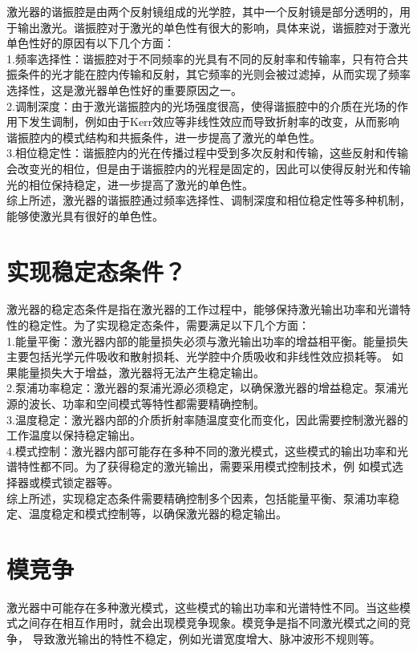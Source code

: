 \documentclass[12pt, a4paper, oneside]{article}
\begin{document}
\begin{spacing}{2.0}
激光器的谐振腔是由两个反射镜组成的光学腔，其中一个反射镜是部分透明的，用于输出激光。谐振腔对于激光的单色性有很大的影响，具体来说，谐振腔对于激光单色性好的原因有以下几个方面：
\\
1.频率选择性：谐振腔对于不同频率的光具有不同的反射率和传输率，只有符合共振条件的光才能在腔内传输和反射，其它频率的光则会被过滤掉，从而实现了频率选择性，这是激光器单色性好的重要原因之一。
\\
2.调制深度：由于激光谐振腔内的光场强度很高，使得谐振腔中的介质在光场的作用下发生调制，例如由于Kerr效应等非线性效应而导致折射率的改变，从而影响谐振腔内的模式结构和共振条件，进一步提高了激光的单色性。
\\
3.相位稳定性：谐振腔内的光在传播过程中受到多次反射和传输，这些反射和传输会改变光的相位，但是由于谐振腔内的光程是固定的，因此可以使得反射光和传输光的相位保持稳定，进一步提高了激光的单色性。
\\
综上所述，激光器的谐振腔通过频率选择性、调制深度和相位稳定性等多种机制，能够使激光具有很好的单色性。

\section{实现稳定态条件？ }
激光器的稳定态条件是指在激光器的工作过程中，能够保持激光输出功率和光谱特性的稳定性。为了实现稳定态条件，需要满足以下几个方面：
\\
1.能量平衡：激光器内部的能量损失必须与激光输出功率的增益相平衡。能量损失主要包括光学元件吸收和散射损耗、光学腔中介质吸收和非线性效应损耗等。
如果能量损失大于增益，激光器将无法产生稳定输出。
\\
2.泵浦功率稳定：激光器的泵浦光源必须稳定，以确保激光器的增益稳定。泵浦光源的波长、功率和空间模式等特性都需要精确控制。
\\
3.温度稳定：激光器内部的介质折射率随温度变化而变化，因此需要控制激光器的工作温度以保持稳定输出。
\\
4.模式控制：激光器内部可能存在多种不同的激光模式，这些模式的输出功率和光谱特性都不同。为了获得稳定的激光输出，需要采用模式控制技术，例
如模式选择器或模式锁定器等。
\\
综上所述，实现稳定态条件需要精确控制多个因素，包括能量平衡、泵浦功率稳定、温度稳定和模式控制等，以确保激光器的稳定输出。

\section{模竞争}
激光器中可能存在多种激光模式，这些模式的输出功率和光谱特性不同。当这些模式之间存在相互作用时，就会出现模竞争现象。模竞争是指不同激光模式之间的竞争，
导致激光输出的特性不稳定，例如光谱宽度增大、脉冲波形不规则等。


\end{spacing}
\end{document}
